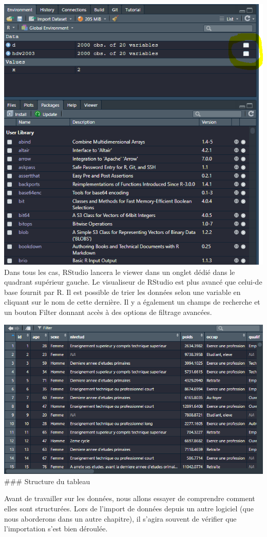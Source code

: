 \documentclass[
]{book}
\begin{document}
\includegraphics[width=1\linewidth]{images/visionneuse}
Dans tous les cas, RStudio lancera le viewer dans un onglet dédié dans le quadrant supérieur gauche. Le visualiseur de RStudio est plus avancé que celui-de base fournit par R. Il est possible de trier les données selon une variable en cliquant sur le nom de cette dernière. Il y a également un champs de recherche et un bouton Filter donnant accès à des options de filtrage avancées.

\includegraphics[width=1\linewidth]{images/viewer_pane}
\#\#\# Structure du tableau

Avant de travailler sur les données, nous allons essayer de comprendre comment elles sont structurées. Lors de l'import de données depuis un autre logiciel (que nous aborderons dans un autre chapitre), il s'agira souvent de vérifier que l'importation s'est bien déroulée.
\end{document}
